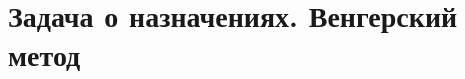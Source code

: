 \documentclass[discrete.tex]{subfiles}
\begin{document}
\section{Задача о назначениях. Венгерский метод}
\end{document}
